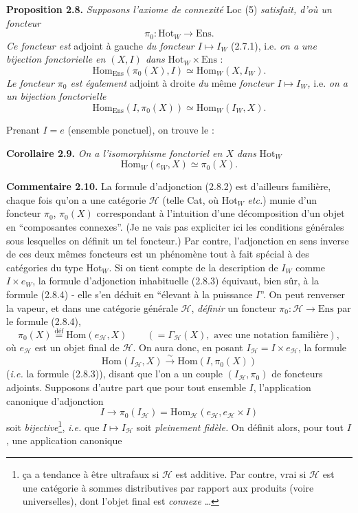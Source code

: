 \textbf{Proposition 2.8.} \textit{Supposons l'axiome de connexité} Loc (5) \textit{satisfait, d'où un foncteur}
\[
\pi_0 : \mathrm{Hot}_W \longrightarrow \mathrm{Ens}. \tag*{(2.8.1)}
\]
\textit{Ce foncteur est} adjoint à gauche \textit{du foncteur $I \longmapsto I_W$} (2.7.1), i.e. \textit{on a une bijection fonctorielle en $(X, I)$ dans} $\mathrm{Hot}_W \times \mathrm{Ens}$ :
\[
\mathrm{Hom}_{\mathrm{Ens}}(\pi_0(X), I) \simeq \mathrm{Hom}_W(X, I_W). \tag*{(2.8.2)}
\]
\textit{Le foncteur $\pi_0$ est également} adjoint à droite \textit{du} même \textit{foncteur $I \longmapsto I_W$,} i.e. \textit{on a un bijection fonctorielle} %
\[
\mathrm{Hom}_{\mathrm{Ens}}(I, \pi_0(X)) \simeq \mathrm{Hom}_W(I_W, X). \tag*{(2.8.3)}
\]

Prenant $I = e$ (ensemble ponctuel), on trouve le :

\textbf{Corollaire 2.9.} \textit{On a l'isomorphisme fonctoriel en $X$ dans} $\mathrm{Hot}_W$
\[
\boxed{\mathrm{Hom}_W(e_W, X) \simeq \pi_0(X).} \tag*{(2.8.4)}
\]

\textbf{Commentaire 2.10.} La formule d'adjonction (2.8.2) est d'ailleurs familière, chaque fois qu'on a une catégorie $\mathcal{H}$ (telle Cat, où $\mathrm{Hot}_W$ \textit{etc.}) %
munie d'un foncteur $\pi_0$, $\pi_0(X)$ correspondant à l'intuition d'une décomposition d'un objet en “composantes connexes”. (Je ne vais pas expliciter ici les conditions générales sous lesquelles on définit un tel foncteur.) Par contre, l'adjonction en sens inverse de ces deux mêmes foncteurs est un phénomène tout à fait spécial à des catégories du type $\mathrm{Hot}_W$. Si on tient compte de la description de $I_W$ comme $I \times e_W$, la formule d'adjonction inhabituelle (2.8.3) équivaut, bien sûr, à la formule (2.8.4) - elle s'en déduit en “élevant à la puissance $I$”. On peut renverser la vapeur, et dans une catégorie générale $\mathcal{H}$, \textit{définir} un foncteur $\pi_0 : \mathcal{H} \longrightarrow \mathrm{Ens}$ par le formule (2.8.4), %
\[
\pi_0(X) \overset{\text{déf}}{=} \mathrm{Hom}(e_{\mathcal{H}}, X) \qquad (= \Gamma_{\mathcal{H}}(X), \text{ avec une notation familière}),
\]
où $e_{\mathcal{H}}$ est un objet final de $\mathcal{H}$. On aura donc, en posant $I_{\mathcal{H}} = I \times e_{\mathcal{H}}$, la formule
\[
\mathrm{Hom}(I_{\mathcal{H}}, X) \xrightarrow{\ \sim\ } \mathrm{Hom}(I, \pi_0(X))
\]
(\textit{i.e.} la formule (2.8.3)), disant que l'on a un couple $(I_{\mathcal{H}}, \pi_0)$ de foncteurs adjoints. Supposons d'autre part que pour tout ensemble $I$, l'application canonique d'adjonction
\[
I \longrightarrow \pi_0(I_{\mathcal{H}}) = \mathrm{Hom}_{\mathcal{H}}(e_{\mathcal{H}}, e_{\mathcal{H}} \times I)
\]
soit \textit{bijective}\footnote{ça a tendance à être ultrafaux si $\mathcal{H}$ est additive. Par contre, vrai si $\mathcal{H}$ est une catégorie à sommes distributives par rapport aux produits (voire universelles), dont l'objet final est \textit{connexe} \ldots}, \textit{i.e.} que $I \longmapsto I_{\mathcal{H}}$ soit \textit{pleinement fidèle.} On définit alors, pour tout $I$, une application canonique

